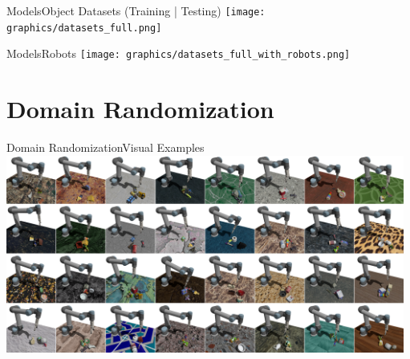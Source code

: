 \begin{frame}{Models}{Object Datasets (Training | Testing)}
    \centering
    \texttt{[image: graphics/datasets\_full.png]}
\end{frame}

\begin{frame}{Models}{Robots}
    \centering
    \texttt{[image: graphics/datasets\_full\_with\_robots.png]}
\end{frame}


\section{Domain Randomization}

\begin{frame}{Domain Randomization}{Visual Examples}
    \centering
    \includegraphics[height=6.5cm]{graphics/domain_randomisation.png}
\end{frame}

